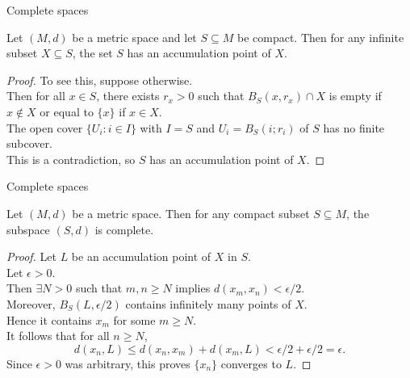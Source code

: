 \documentclass{beamer}
\begin{document}
\begin{frame}{Complete spaces}
\begin{lem}
Let $(M,d)$ be a metric space and let $S\subseteq M$ be compact.
\pause
Then for any infinite subset $X\subseteq S$, the set $S$ has an accumulation point of $X$.
\end{lem}
\pause
\begin{proof}
\pause
To see this, suppose otherwise.\\
\pause
Then for all $x\in S$, there exists $r_x > 0$ such that $B_S(x,r_x)\cap X$ is empty if $x\notin X$ or equal to $\{x\}$ if $x\in X$.\\
\pause
The open cover $\{U_i: i\in I\}$ with $I=S$ and $U_i = B_S(i; r_i)$ of $S$ has no finite subcover.\\
\pause
This is a contradiction, so $S$ has an accumulation point of $X$.
\end{proof}
\end{frame}

\begin{frame}{Complete spaces}
\begin{thm}
Let $(M,d)$ be a metric space.
Then for any compact subset $S\subseteq M$, the subspace $(S,d)$ is complete.
\end{thm}
\begin{proof}
\pause
Let $L$ be an accumulation point of $X$ in $S$.\\
\pause
Let $\epsilon > 0$.\\
\pause
Then $\exists N>0$ such that $m,n \geq N$ implies $d(x_m,x_n) < \epsilon/2$.\\
\pause
Moreover, $B_S(L,\epsilon/2)$ contains infinitely many points of $X$.\\
\pause
Hence it contains $x_m$ for some $m\geq N$.\\
\pause
It follows that for all $n\geq N$,
$$d(x_n,L)\leq d(x_n,x_m) + d(x_m,L) < \epsilon/2 + \epsilon/2 = \epsilon.$$
\pause
Since $\epsilon > 0$ was arbitrary, this proves $\{x_n\}$ converges to $L$.
\end{proof}
\end{frame}
\end{document}
